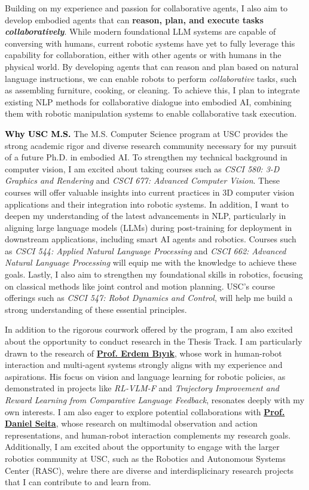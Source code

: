 \documentclass[10pt]{article}
\newcommand{\statement}[1]{\medskip\noindent
  \textcolor{black}{\textbf{#1}}\space
}
\begin{document}
\noindent Building on my experience and passion for collaborative agents, I also aim to develop embodied agents that can \textbf{reason, plan, and execute tasks \textit{collaboratively}}. While modern foundational LLM systems are capable of conversing with humans, current robotic systems have yet to fully leverage this capability for collaboration, either with other agents or with humans in the physical world. By developing agents that can reason and plan based on natural language instructions, we can enable robots to perform \textit{collaborative} tasks, such as assembling furniture, cooking, or cleaning. To achieve this, I plan to integrate existing NLP methods for collaborative dialogue into embodied AI, combining them with robotic manipulation systems to enable collaborative task execution.

\statement{Why USC M.S.} The M.S. Computer Science program at USC provides the strong academic rigor and diverse research community necessary for my pursuit of a future Ph.D. in embodied AI. To strengthen my technical background in computer vision, I am excited about taking courses such as \textit{CSCI 580: 3-D Graphics and Rendering} and \textit{CSCI 677: Advanced Computer Vision}. These courses will offer valuable insights into current practices in 3D computer vision applications and their integration into robotic systems. In addition, I want to deepen my understanding of the latest advancements in NLP, particularly in aligning large language models (LLMs) during post-training for deployment in downstream applications, including smart AI agents and robotics. Courses such as \textit{CSCI 544: Applied Natural Language Processing} and \textit{CSCI 662: Advanced Natural Language Processing} will equip me with the knowledge to achieve these goals. Lastly, I also aim to strengthen my foundational skills in robotics, focusing on classical methods like joint control and motion planning. USC's course offerings such as \textit{CSCI 547: Robot Dynamics and Control}, will help me build a strong understanding of these essential principles.

\noindent In addition to the rigorous courwork offered by the program, I am also excited about the opportunity to conduct research in the Thesis Track. I am particularly drawn to the research of \href{https://ebiyik.github.io/}{\textbf{Prof. Erdem Bıyık}}, whose work in human-robot interaction and multi-agent systems strongly aligns with my experience and aspirations.  His focus on vision and language learning for robotic policies, as demonstrated in projects like \textit{RL-VLM-F} and \textit{Trajectory Improvement and Reward Learning from Comparative Language Feedback}, resonates deeply with my own interests. I am also eager to explore potential collaborations with \href{https://danielseita.github.io/}{\textbf{Prof. Daniel Seita}}, whose research on multimodal observation and action representations, and human-robot interaction complements my research goals. Additionally, I am excited about the opportunity to engage with the larger robotics  community at USC, such as the Robotics and Autonomous Systems Center (RASC), wehre there are diverse and interdisplicinary research projects that I can contribute to and learn from.
\end{document}
